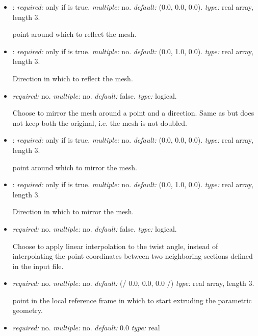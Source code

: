\begin{itemize}
\item {}: \textit{required:} only if  is true. \textit{multiple:} no. \textit{default:} (0.0, 0.0, 0.0). \textit{type:} real array, length 3.

point around which to reflect the mesh.

\item {}: \textit{required:} only if  is true. \textit{multiple:} no. \textit{default:} (0.0, 1.0, 0.0). \textit{type:} real array, length 3.

Direction in which to reflect the mesh.

\item {} \textit{required:} no. \textit{multiple:} no. \textit{default:} false. \textit{type:} logical.

Choose to mirror the mesh around a point and a direction. Same as  but does not keep both the original, i.e. the mesh is not doubled.

\item {}:  \textit{required:} only if  is true. \textit{multiple:} no. \textit{default:} (0.0, 0.0, 0.0). \textit{type:} real array, length 3.

point around which to mirror the mesh.

\item {}: \textit{required:} only if  is true. \textit{multiple:} no. \textit{default:} (0.0, 1.0, 0.0). \textit{type:} real array, length 3.

Direction in which to mirror the mesh.

\item {} \textit{required:} no. \textit{multiple:} no. \textit{default:} false. \textit{type:} logical.

Choose to apply linear interpolation to the twist angle, instead of interpolating the point coordinates between two neighboring sections defined in the input file.

\item {} \textit{required:} no. \textit{multiple:} no. \textit{default:} (/ 0.0, 0.0, 0.0 /) \textit{type:} real array, length 3.

point in the local reference frame in which to start extruding the parametric geometry.

\item {} \textit{required:} no. \textit{multiple:} no. \textit{default:} 0.0 \textit{type:} real


\end{itemize}
